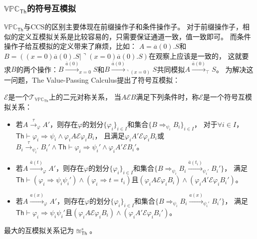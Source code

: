    \subsubsection{$\mathbb{VPC}_\mathsf{Th}$的符号互模拟}\label{ch:vpc_symbolic_bisimulation}
   $\mathbb{VPC}_{\mathsf{Th}}$与CCS的区别主要体现在前缀操作子和条件操作子。
   对于前缀操作子，相似的定义互模拟关系是比较容易的，只需要保证通道一致，值一致即可。
   而条件操作子给互模拟的定义带来了麻烦，比如：
   $A=\overline{a}(0).S$和$B=((x=0) \overline{a}(0).S|\urcorner (x=0) \overline{a}(0).S)$在观察上应该是一致的，
   这就要求$B$的两个操作：$B\stackrel{\overline{a}(0)}{\longrightarrow}_{x=0} S$和$B\stackrel{\overline{a}(0)}{\longrightarrow}_{\urcorner (x=0)} S$共同模拟$A\stackrel{\overline{a}(0)}{\longrightarrow}_{\top} S$。
   为解决这一问题，The Value-Passing Calculus提出了符号互模拟：
   \begin{definition}[符号互模拟]\label{def:symbolic_bisimulation}
      $\mathcal{E}$是一个$\mathcal{T}_{\mathbb{VPC}_{\mathsf{Th}}}$上的二元对称关系，
      当$A\mathcal{E}B$满足下列条件时，称$\mathcal{E}$是一个符号互模拟关系：
      \begin{itemize}
         \item {
            若$A\stackrel{\tau}{\rightarrow}_{\varphi} A'$，则存在$\varphi$的划分$\{\varphi_i\}_{i\in I}$和集合$\{B\Rightarrow_{\psi_i} B_i\}_{i\in I}$，
            对于$\forall i\in I$，$\mathsf{Th}\vdash \varphi_i\Rightarrow \psi_i\wedge \varphi_i A\mathcal{E} \varphi_i B_i$，
            且满足$\varphi_i A'\mathcal{E} \varphi_i B_i$或$B_i\stackrel{\tau}{\rightarrow}_{\psi_i'}B_i'\wedge \mathsf{Th}\vdash \varphi_i\Rightarrow \psi_i'\wedge \varphi_i A'\mathcal{E} B_i'$。
         }
         \item {
            若$A\stackrel{\overline{a}(t)}{\rightarrow}_{\varphi} A'$，则存在$\varphi$的划分$\{\varphi_i\}_{i\in I}$和集合$\{B\Rightarrow_{\psi_i}B_i\stackrel{\overline{a}(t_i)}{\rightarrow}_{\psi_i'}B_i'\}$，
            满足$\mathsf{Th}\vdash (\varphi_i\Rightarrow \psi_i\psi_i')\wedge (\varphi_i \Rightarrow t=t_i)$且$(\varphi_i A\mathcal{E}\varphi_i B_i)\wedge(\varphi_i A'\mathcal{E}\varphi_i B_i')$。
         }
         \item {
            若$A\stackrel{a(x)}{\rightarrow}_{\varphi} A'$，则存在$\varphi$的划分$\{\varphi_i\}_{i\in I}$和集合$\{B\Rightarrow_{\psi_i}B_i\stackrel{a(x)}{\rightarrow}_{\psi_i'}B_i'\}$，
            满足$\mathsf{Th}\vdash \varphi_i\Rightarrow \psi_i\psi_i'$且$(\varphi_i A\mathcal{E}\varphi_i B_i)\wedge(\varphi_i A'\mathcal{E}\varphi_i B_i')$。
         }
      \end{itemize}
      最大的互模拟关系记为$\approxeq_{\mathsf{Th}}^s$。
   \end{definition}

